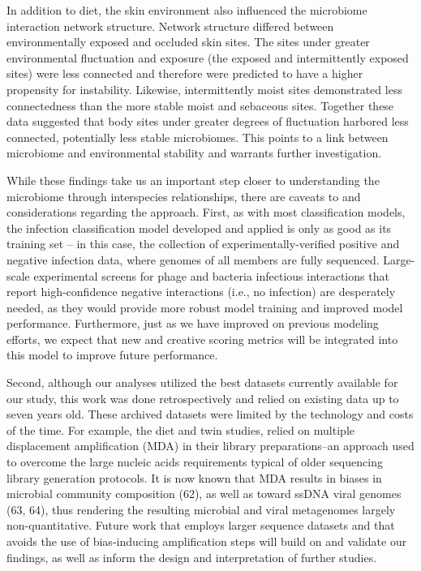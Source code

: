 \documentclass[12pt,]{article}
\begin{document}
In addition to diet, the skin environment also influenced the microbiome
interaction network structure. Network structure differed between
environmentally exposed and occluded skin sites. The sites under greater
environmental fluctuation and exposure (the exposed and intermittently
exposed sites) were less connected and therefore were predicted to have
a higher propensity for instability. Likewise, intermittently moist
sites demonstrated less connectedness than the more stable moist and
sebaceous sites. Together these data suggested that body sites under
greater degrees of fluctuation harbored less connected, potentially less
stable microbiomes. This points to a link between microbiome and
environmental stability and warrants further investigation.

While these findings take us an important step closer to understanding
the microbiome through interspecies relationships, there are caveats to
and considerations regarding the approach. First, as with most
classification models, the infection classification model developed and
applied is only as good as its training set -- in this case, the
collection of experimentally-verified positive and negative infection
data, where genomes of all members are fully sequenced. Large-scale
experimental screens for phage and bacteria infectious interactions that
report high-confidence negative interactions (i.e., no infection) are
desperately needed, as they would provide more robust model training and
improved model performance. Furthermore, just as we have improved on
previous modeling efforts, we expect that new and creative scoring
metrics will be integrated into this model to improve future
performance.

Second, although our analyses utilized the best datasets currently
available for our study, this work was done retrospectively and relied
on existing data up to seven years old. These archived datasets were
limited by the technology and costs of the time. For example, the diet
and twin studies, relied on multiple displacement amplification (MDA) in
their library preparations--an approach used to overcome the large
nucleic acids requirements typical of older sequencing library
generation protocols. It is now known that MDA results in biases in
microbial community composition (62), as well as toward ssDNA viral
genomes (63, 64), thus rendering the resulting microbial and viral
metagenomes largely non-quantitative. Future work that employs larger
sequence datasets and that avoids the use of bias-inducing amplification
steps will build on and validate our findings, as well as inform the
design and interpretation of further studies.
\end{document}
